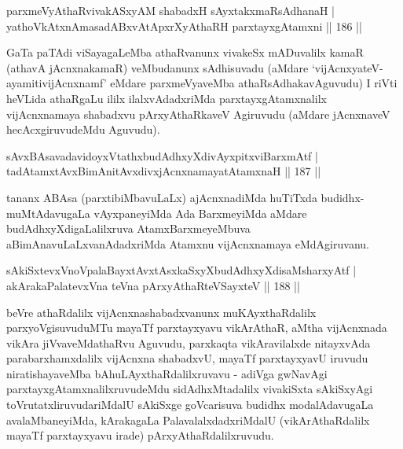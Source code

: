 \begin{shl}
parxmeVyAthaRvivakASxyAM shabadxH sAyxtakxmaRsAdhanaH |\\
yathoVkAtxnAmasadABxvAtApxrXyAthaRH parxtayxgAtamxni \hfill || 186 ||
\end{shl}

\begin{artha}
GaTa paTAdi viSayagaLeMba athaRvanunx vivakeSx mADuvalilx kamaR (athavA 
jAcnxnakamaR) veMbudanunx sAdhisuvadu (aMdare `vijAcnxyateV-ayamiti\break vijAcnxnamf' eMdare parxmeVyaveMba athaRsAdhakavAguvudu) I riVti heVLida athaRgaLu ililx ilalxvAdadxriMda parxtayxgAtamxnalilx vijAcnxnamaya shabadxvu pArxyAthaRkaveV Agiruvudu (aMdare jAcnxnaveV hecAcxgiruvudeMdu Aguvudu).\\
\end{artha}


\begin{shl}
sAvxBAsavadavidoyxVtathxbudAdhxyXdivAyxpitxviBarxmAtf |\\
tadAtamxtAvxBimAnitAvxdivxjAcnxnamayatA\s \s tamxnaH \hfill || 187 ||
\end{shl}

\begin{artha}
tananx ABAsa (parxtibiMbavuLaLx) ajAcnxnadiMda huTiTxda budidhx-muMtAdavugaLa vAyxpaneyiMda Ada BarxmeyiMda aMdare budAdhxyXdigaLalilxruva AtamxBarxmeyeMbuva aBimAnavuLaLxvanAdadxriMda Atamxnu vijAcnxnamaya eMdAgiruvanu.
\end{artha}

\begin{shl}
sAkiSxtevxVnoVpalaBayxtAvxtAsxkaSxyXbudAdhxyXdisaMsharxyAtf |\\
akArakaPalatevxVna teVna pArxyAthaRteVSayxteV \hfill || 188 ||
\end{shl}


\begin{artha}
beVre athaRdalilx vijAcnxnashabadxvanunx muKAyxthaRdalilx parxyoVgisuvuduMTu  mayaTf parxtayxyavu vikArAthaR, aMtha vijAcnxnada vikAra jiVvaveMdathaRvu Aguvudu, parxkaqta vikAravilalxde nitayxvAda parabarxhamxdalilx vijAcnxna shabadxvU, mayaTf  parxtayxyavU iruvudu niratishayaveMba bAhuLAyxthaRdalilxruvavu - adiVga gwNavAgi parxtayxgAtamxnalilxruvudeMdu sidAdhxMtadalilx vivakiSxta sAkiSxyAgi toVrutatxliruvudariMdalU sAkiSxge goVcarisuva budidhx modalAdavugaLa avalaMbaneyiMda, kArakagaLa PalavalalxdadxriMdalU (vikArAthaRdalilx mayaTf parxtayxyavu irade) pArxyAthaRdalilxruvudu.
\end{artha}

